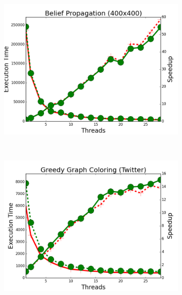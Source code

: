 
\begin{figure}[h]
        \begin{subfigure}[b]{\smallplotsize\textwidth}
                \includegraphics[width=\textwidth]{experiments/scalability/no-refs-allocator-belief-propagation-400.png}
                \label{fig:implementation:no_refs_bp}
        \end{subfigure}
        ~
        \begin{subfigure}[b]{\smallplotsize\textwidth}
                \includegraphics[width=\textwidth]{experiments/scalability/no-refs-allocator-greedy-graph-coloring-twitter.png}
                \label{fig:implementation:no_refs_ggc}
        \end{subfigure}

\end{figure}
